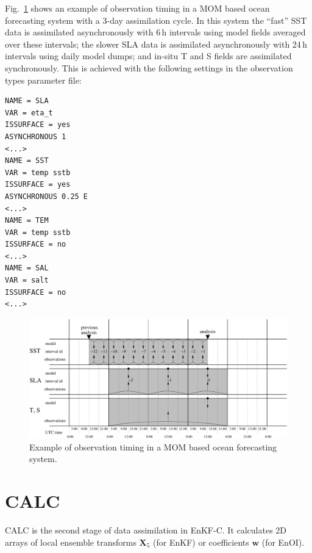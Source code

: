 \documentclass[11pt]{report}
\newcommand{\mb} {\mathbf}
\begin{document}
Fig.~\ref{fig:mom_timing} shows an example of observation timing in a MOM based ocean forecasting system with a 3-day assimilation cycle.
In this system the ``fast'' SST data is assimilated asynchronously with 6\,h intervals using model fields averaged over these intervals; the slower SLA data is assimilated asynchronously with 24\,h intervals using daily model dumps; and in-situ T and S fields are assimilated synchronously.
This is achieved with the following settings in the observation types parameter file:
\begin{Verbatim}[frame=single,fontsize=\footnotesize]
NAME = SLA
VAR = eta_t
ISSURFACE = yes
ASYNCHRONOUS 1
<...>
NAME = SST
VAR = temp sstb
ISSURFACE = yes
ASYNCHRONOUS 0.25 E
<...>
NAME = TEM
VAR = temp sstb
ISSURFACE = no
<...>
NAME = SAL
VAR = salt
ISSURFACE = no
<...>
\end{Verbatim}
\begin{figure}[h]
  \centering
  \includegraphics[width = \textwidth]{plots/obstiming_example.pdf}
  \caption{Example of observation timing in a MOM based ocean forecasting system.}
  \label{fig:mom_timing}
\end{figure}

\section{CALC}

CALC is the second stage of data assimilation in EnKF-C.
It calculates 2D arrays of local ensemble transforms $\mb X_5$ (for EnKF) or coefficients $\mb w$ (for EnOI).
\end{document}
